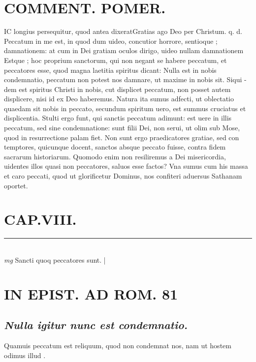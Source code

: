 \documentclass{article}
\begin{document}
\begin{pages}
\section*{COMMENT. POMER.  }\pstart IC longius persequitur, quod antea dixeratGratias ago Deo per Christum. q. d. Peccatum in me est, in quod dum uideo, concutior horrore, sentioque ; damnationem: at cum in Dei gratiam oculos dirigo, uideo nullam damnationem Estque ; hoc proprium sanctorum, qui non negant se habere peccatum, et peccatores esse, quod magna laetitia spiritus dicant: Nulla est in nobis condemnatio, peccatum non potest nos damnare, ut maxime in nobis sit. Siqui - dem est spiritus Christi in nobis, cut displicet peccatum, non posset autem displicere, nisi id ex Deo haberemus. Natura ita sumus adfecti, ut oblectatio quaedam sit nobis in peccato, secundum spiritum uero, est summus cruciatus et displicentia. Stulti ergo funt, qui sanctis peccatum adimunt: est uere in illis peccatum, sed sine condemnatione: sunt filii Dei, non serui, ut olim sub Mose, quod in resurrectione palam fiet. Non sunt ergo praedicatores gratiae, sed con temptores, quicunque docent, sanctos absque peccato fuisse, contra fidem sacrarum historiarum. Quomodo enim non resiliremus a Dei misericordia, uidentes illos quasi non peccatores, saluos esse factos? Vna sumus cum his massa et caro peccati, quod ut glorificetur Dominus, nos confiteri aduersus Sathanam oportet.   \pend
\endnumbering\beginnumbering\section{CAP.VIII.}
\vspace{0.5cm}\noindent
\vspace{0.2cm}\rule{1cm}{0.2pt}\\ 
\hspace{0.2cm}\textit{mg}
\footnotesize Sancti quoq peccatores sunt. 
\normalsize| 
\section*{IN EPIST. AD ROM.  81 }
\marginpar{[ p.]}
{}
\subsection*{\textit{Nulla igitur nunc est condemnatio. }}\pstart Quamuis peccatum est reliquum, quod non condemnat nos, nam ut hostem odimus illud .   \pend
{}
{}

\end{pages}
\end{document}
